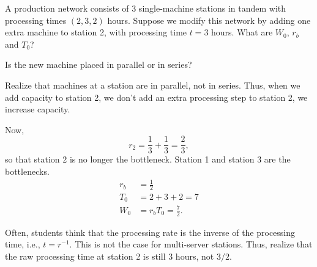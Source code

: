 \begin{exercise}
 A production network consists of 3 single-machine stations in tandem
 with processing times $(2, 3, 2)$ hours. Suppose we modify this
 network by adding one extra machine to station 2, with processing
 time $t=3$ hours. What are $W_0$, $r_b$ and $T_0$?
\begin{hint}
Is the new machine placed in parallel or in series?
\end{hint}
\begin{solution}
 Realize that machines at a station are in parallel, not in
 series. Thus, when we add capacity to station 2, we don't add an
 extra processing step to station 2, we increase capacity. 

 Now, 
 \begin{equation*}
 r_2 = \frac13 + \frac13 = \frac 23,
 \end{equation*}
 so that station 2 is no longer the bottleneck. Station 1 and
 station 3 are the bottlenecks.
 \begin{align*}
 r_b &= \frac12 \\
 T_0 &= 2 + 3 + 2 = 7\\
 W_0 &= r_b T_0 = \frac72.
 \end{align*}

 Often, students think that the processing rate is the inverse of
 the processing time, i.e., $t=r^{-1}$. This is not the case for
 multi-server stations. Thus, realize that the raw processing time
 at station 2 is still $3$ hours, not $3/2$.
\end{solution}
\end{exercise}



